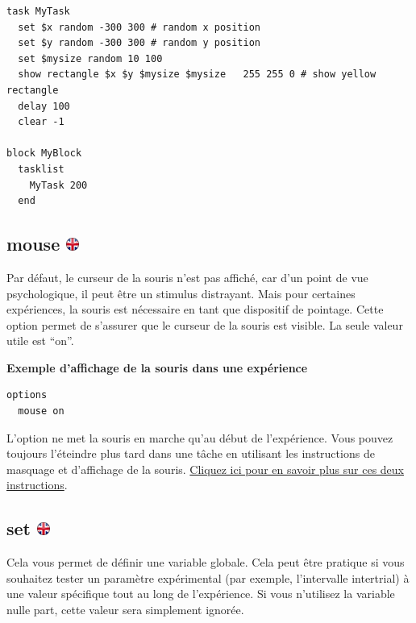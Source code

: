 \documentclass[
]{book}
\begin{document}
\begin{verbatim}
task MyTask
  set $x random -300 300 # random x position
  set $y random -300 300 # random y position
  set $mysize random 10 100
  show rectangle $x $y $mysize $mysize   255 255 0 # show yellow rectangle
  delay 100
  clear -1

block MyBlock
  tasklist
    MyTask 200
  end
\end{verbatim}

\hypertarget{mouse}{%
\subsection[mouse ]{\texorpdfstring{mouse \href{https://www.psytoolkit.org/doc3.4.0/syntax.html\#options-mouse}{\protect\includegraphics{img/ukflag.png}}}{mouse }}\label{mouse}}

Par défaut, le curseur de la souris n'est pas affiché, car d'un point de vue psychologique, il peut être un stimulus distrayant. Mais pour certaines expériences, la souris est nécessaire en tant que dispositif de pointage. Cette option permet de s'assurer que le curseur de la souris est visible. La seule valeur utile est ``on''.

\textbf{Exemple d'affichage de la souris dans une expérience}

\begin{verbatim}
options
  mouse on
\end{verbatim}

L'option ne met la souris en marche qu'au début de l'expérience. Vous pouvez toujours l'éteindre plus tard dans une tâche en utilisant les instructions de masquage et d'affichage de la souris. \protect\hyperlink{task-mouse}{Cliquez ici pour en savoir plus sur ces deux instructions}.

\hypertarget{set}{%
\subsection[set ]{\texorpdfstring{set \href{https://www.psytoolkit.org/doc3.4.0/syntax.html\#options-set}{\protect\includegraphics{img/ukflag.png}}}{set }}\label{set}}

Cela vous permet de définir une variable globale. Cela peut être pratique si vous souhaitez tester un paramètre expérimental (par exemple, l'intervalle intertrial) à une valeur spécifique tout au long de l'expérience. Si vous n'utilisez la variable nulle part, cette valeur sera simplement ignorée.
\end{document}
